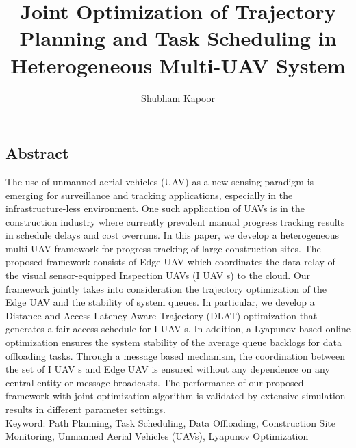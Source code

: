 \documentclass{article}
\title{Joint Optimization of Trajectory Planning and Task Scheduling in
Heterogeneous Multi-UAV System}
\author{Shubham Kapoor}
\affil{Department of Computer Scince, IIT Ropar}
\begin{document}
\maketitle
\begin{multicols}{2}
\section*{Abstract}
The use of unmanned aerial vehicles (UAV) as a new sensing
paradigm is emerging for surveillance and tracking
applications, especially in the infrastructure-less environment.
One such application of UAVs is in the construction
industry where currently prevalent manual progress
tracking results in schedule delays and cost overruns. In
this paper, we develop a heterogeneous multi-UAV framework
for progress tracking of large construction sites. The
proposed framework consists of Edge UAV which coordinates
the data relay of the visual sensor-equipped Inspection
UAVs (I UAV s) to the cloud. Our framework jointly
takes into consideration the trajectory optimization of the
Edge UAV and the stability of system queues. In particular,
we develop a Distance and Access Latency Aware
Trajectory (DLAT) optimization that generates a fair access
schedule for I UAV s. In addition, a Lyapunov based
online optimization ensures the system stability of the average
queue backlogs for data offloading tasks. Through a
message based mechanism, the coordination between the
set of I UAV s and Edge UAV is ensured without any
dependence on any central entity or message broadcasts.
The performance of our proposed framework with joint
optimization algorithm is validated by extensive simulation
results in different parameter settings.\\
Keyword: Path Planning, Task Scheduling, Data Offloading,
Construction Site Monitoring, Unmanned Aerial
Vehicles (UAVs), Lyapunov Optimization


\end{multicols}
\end{document}
